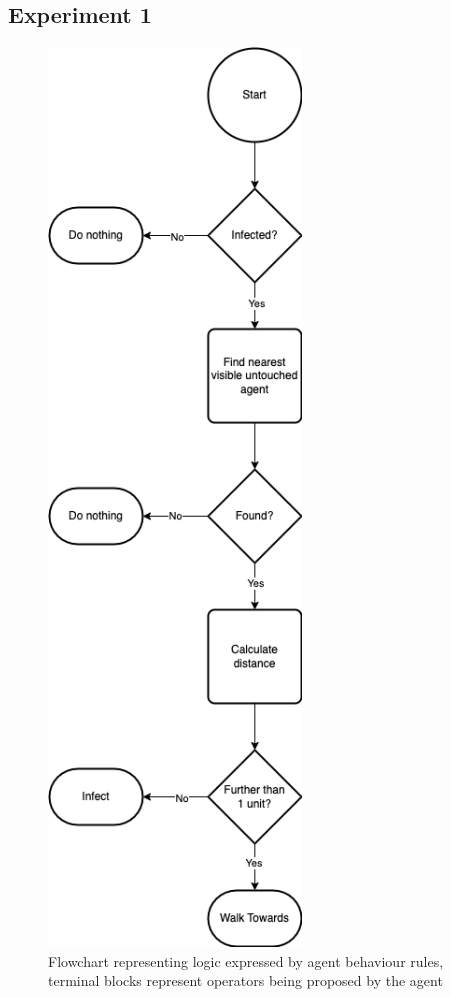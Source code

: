 \subsection{Experiment 1}

\begin{figure}[H]
    \centering
    \includegraphics[width=0.6\textwidth]{images/chapter2/sir_logic.drawio.png}
    \caption{Flowchart representing logic expressed by agent behaviour rules, terminal blocks represent operators being proposed by the agent}\label{fig:sir_logic.drawio.png}
\end{figure}

